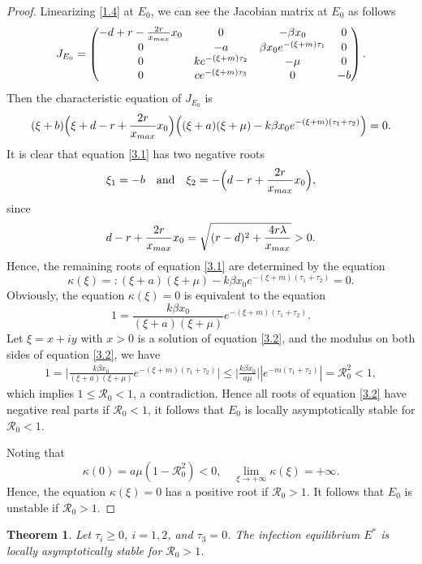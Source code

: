 \documentclass[10pt,a4paper]{amsart}
\numberwithin{equation}{section}
\newtheorem{theorem}{Theorem}[section]
\begin{document}
\begin{proof}
Linearizing \eqref{1.4} at $E_0$, we can see the Jacobian matrix at $E_0$ as follows
\[
J_{E_0}=\begin{pmatrix}
-d+r-\frac{2r}{x_{\rm max}}x_0&0&-\beta x_0&0\\
0&-a&\beta x_0e^{-(\xi+m)\tau_1}& 0\\
0&ke^{-(\xi+m)\tau_2}&-\mu&0\\ 0&ce^{-(\xi+m)\tau_3}&0&-b
\end{pmatrix}.
\]
Then the characteristic equation of $J_{E_0}$ is
\begin{equation}\label{3.1}
(\xi+b)\Big(\xi+d-r+{\frac{2r}{x_{\rm max}}x_0}\Big)\Big((\xi+a)(\xi+\mu)
-k\beta x_0e^{-(\xi+m)(\tau_1+\tau_2)}\Big)=0.
\end{equation}
It is clear that equation \eqref{3.1} has two negative roots
\[
\xi_1=-b \quad \text{and}\quad  \xi_2=-\Big(d-r+\frac{2r}{x_{\rm max}}x_0\Big),
\]
since
$$
d-r+{\frac{2r}{x_{\rm max}}x_0}=\sqrt{(r-d)^{2}+\frac{4r\lambda}{x_{\rm max}}}>0.
$$
Hence, the remaining roots of equation \eqref{3.1} are determined by the 
equation
$$
\kappa(\xi)=:(\xi+a)(\xi+\mu)-k\beta x_0e^{-(\xi+m)(\tau_1+\tau_2)}= 0.
$$	
Obviously, the equation $\kappa(\xi)=0$ is equivalent to the equation
\begin{equation}\label{3.2}
1=\frac{k\beta x_0 }{(\xi+a)(\xi+\mu)}e^{-(\xi+m)(\tau_1+\tau_2)}.
\end{equation}	
Let $\xi=x+iy $ with $x>0$ is a solution of equation \eqref{3.2}, and the modulus 
on both sides of equation \eqref{3.2}, we have
\begin{align*}
1=\Big|\frac{k\beta x_0}{(\xi+a)(\xi+\mu)}e^{-(\xi+m)(\tau_1+\tau_2)}\Big|
\leqslant \Big|\frac{k\beta x_0 }{a\mu}\Big||e^{-m(\tau_1+\tau_2)}|= \mathcal{R}_0^{2}<1,
\end{align*}
which implies $1\leq \mathcal{R}_0<1$, a contradiction. 
Hence all roots of equation \eqref{3.2} have
negative real parts if $\mathcal{R}_0<1$, it follows that $E_0$ is locally 
asymptotically stable for $\mathcal{R}_0<1$.
	
Noting that
$$
\kappa(0)=a\mu(1-\mathcal{R}_0^{2})<0, \quad 
\lim_{\xi\to+\infty}\kappa(\xi)=+\infty.
$$
Hence, the equation $\kappa(\xi)=0$ has a positive root if $\mathcal{R}_0>1$. 
It follows that $E_0$ is unstable if $\mathcal{R}_0>1$.	
\end{proof}

\begin{theorem}\label{T3.2}
Let $\tau_{i}\geqslant0$, $i=1,2$, and $\tau_3=0$. The infection equilibrium $E^{*}$ 
is locally asymptotically stable for $\mathcal{R}_0>1$.
\end{theorem}
\end{document}
